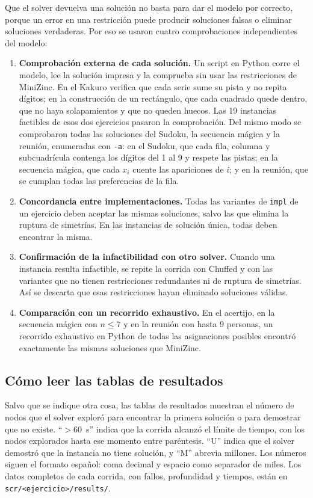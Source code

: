 Que el solver devuelva una solución no basta para dar el modelo por correcto, porque un error en una restricción puede producir soluciones falsas o eliminar soluciones verdaderas. Por eso se usaron cuatro comprobaciones independientes del modelo:

\begin{enumerate}
    \item \textbf{Comprobación externa de cada solución.} Un script en Python corre el modelo, lee la solución impresa y la comprueba sin usar las restricciones de MiniZinc. En el Kakuro verifica que cada serie sume su pista y no repita dígitos; en la construcción de un rectángulo, que cada cuadrado quede dentro, que no haya solapamientos y que no queden huecos. Las 19 instancias factibles de esos dos ejercicios pasaron la comprobación. Del mismo modo se comprobaron todas las soluciones del Sudoku, la secuencia mágica y la reunión, enumeradas con \texttt{-a}: en el Sudoku, que cada fila, columna y subcuadrícula contenga los dígitos del 1 al 9 y respete las pistas; en la secuencia mágica, que cada $x_i$ cuente las apariciones de $i$; y en la reunión, que se cumplan todas las preferencias de la fila.
    \item \textbf{Concordancia entre implementaciones.} Todas las variantes de \texttt{impl} de un ejercicio deben aceptar las mismas soluciones, salvo las que elimina la ruptura de simetrías. En las instancias de solución única, todas deben encontrar la misma.
    \item \textbf{Confirmación de la infactibilidad con otro solver.} Cuando una instancia resulta infactible, se repite la corrida con Chuffed y con las variantes que no tienen restricciones redundantes ni de ruptura de simetrías. Así se descarta que esas restricciones hayan eliminado soluciones válidas.
    \item \textbf{Comparación con un recorrido exhaustivo.} En el acertijo, en la secuencia mágica con $n \le 7$ y en la reunión con hasta 9 personas, un recorrido exhaustivo en Python de todas las asignaciones posibles encontró exactamente las mismas soluciones que MiniZinc.
\end{enumerate}

\subsection{Cómo leer las tablas de resultados}

Salvo que se indique otra cosa, las tablas de resultados muestran el número de nodos que el solver exploró para encontrar la primera solución o para demostrar que no existe. \enquote{$>60$~s} indica que la corrida alcanzó el límite de tiempo, con los nodos explorados hasta ese momento entre paréntesis. \enquote{U} indica que el solver demostró que la instancia no tiene solución, y \enquote{M} abrevia millones. Los números siguen el formato español: coma decimal y espacio como separador de miles. Los datos completos de cada corrida, con fallos, profundidad y tiempos, están en \texttt{scr/<ejercicio>/results/}.
